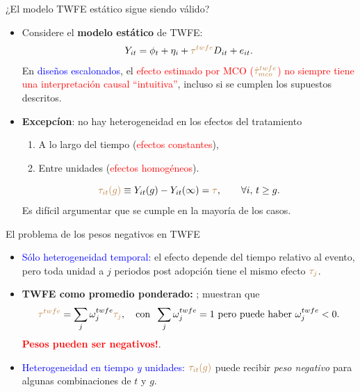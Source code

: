 \documentclass[10pt, xcolor=dvipsnames]{beamer}
\begin{document}
\begin{frame}{¿El modelo TWFE estático sigue siendo válido?}
\begin{itemize}\setlength{\itemsep}{1.0em}
    \item Considere el \textbf{modelo estático} de TWFE:
	\begin{align*}
	Y_{it} = \phi_t + \eta_i + \textcolor{brown}{\tau^{twfe}} D_{it} + e_{it}.
	\end{align*}
    En \textcolor{blue}{diseños escalonados}, el \textcolor{red}{efecto estimado por MCO (\(\textcolor{brown}{\hat \tau^{twfe}_{mco}}\)) no siempre tiene una interpretación causal ``intuitiva''}, incluso si se cumplen los supuestos descritos. 
    \item \textbf{Excepcíon}: no hay heterogeneidad en los efectos del tratamiento 
    \vspace{0.3em}
    \begin{enumerate}\setlength{\itemsep}{0.2em}
        \item A lo largo del tiempo (\textcolor{red}{efectos constantes}), %
        \item Entre unidades (\textcolor{red}{efectos homogéneos}). %
    \end{enumerate}
    \vspace{0.5em}
    \[
        \textcolor{brown}{\tau_{it}(g)} \equiv Y_{it}(g) - Y_{it}(\infty) = \textcolor{brown}{\tau}, \qquad \forall i,\, t\geq g.
    \]
    Es difícil argumentar que se cumple en la mayoría de los casos.
\end{itemize}
\end{frame}


\begin{frame}{El problema de los pesos negativos en TWFE}
\begin{itemize}\setlength{\itemsep}{1.0em}
    \item \textcolor{blue}{Sólo heterogeneidad temporal:} el efecto depende del tiempo relativo al evento, pero toda unidad a \(j\) periodos post adopción tiene el mismo efecto \(\textcolor{brown}{\tau_j}\). 
    \item \textbf{TWFE como promedio ponderado:} \citet{DeChaisemartin2020}; \citet{Goodman-Bacon2021} muestran que
    \vspace{0.0em}
    \[
        \textcolor{brown}{\tau^{twfe}} = \sum_j \omega^{twfe}_j \textcolor{brown}{\tau_j},\quad \text{con} \;\; \sum_j\omega^{twfe}_j=1\ \text{pero puede haber } \omega^{twfe}_j<0.
    \]
    \textcolor{red}{\textbf{Pesos pueden ser negativos!}}.  
    \item \textcolor{blue}{Heterogeneidad en tiempo \emph{y} unidades:} \(\textcolor{brown}{\tau_{it}(g)}\) puede recibir \emph{peso negativo} para algunas combinaciones de \(t\) y \(g\).
\end{itemize}
\end{frame}
\end{document}
